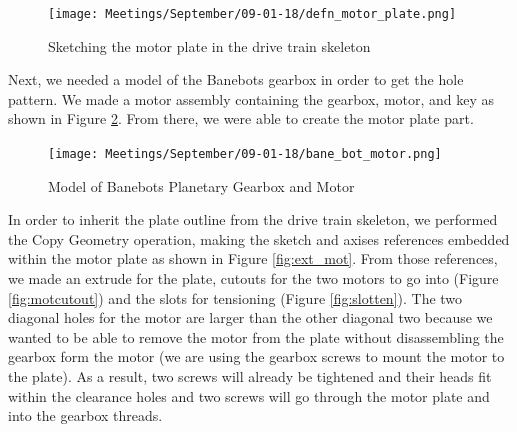 \begin{figure}[htp]
\centering
\texttt{[image: Meetings/September/09-01-18/defn\_motor\_plate.png]}
\caption{Sketching the motor plate in the drive train skeleton}
\label{fig:motor_plate_skel}
\end{figure}

Next, we needed a model of the Banebots gearbox in order to get the hole pattern. We made a motor assembly containing the gearbox, motor, and key as shown in Figure \ref{fig:banemod}. From there, we were able to create the motor plate part.

\begin{figure}[htp]
\centering
\texttt{[image: Meetings/September/09-01-18/bane\_bot\_motor.png]}
\caption{Model of Banebots Planetary Gearbox and Motor}
\label{fig:banemod}
\end{figure}

In order to inherit the plate outline from the drive train skeleton, we performed the Copy Geometry operation, making the sketch and axises references embedded within the motor plate as shown in Figure \ref{fig:ext_mot}. From those references, we made an extrude for the plate, cutouts for the two motors to go into (Figure \ref{fig:motcutout}) and the slots for tensioning (Figure \ref{fig:slotten}). The two diagonal holes for the motor are larger than the other diagonal two because we wanted to be able to remove the motor from the plate without disassembling the gearbox form the motor (we are using the gearbox screws to mount the motor to the plate). As a result, two screws will already be tightened and their heads fit within the clearance holes and two screws will go through the motor plate and into the gearbox threads.








